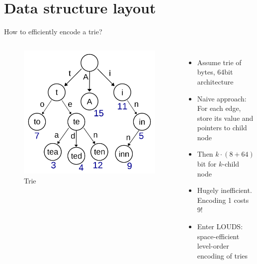 \documentclass{beamer}
\begin{document}
\section{Data structure layout}

\begin{frame}{How to efficiently encode a trie?}
		\begin{columns}
				\begin{figure}
						\centering
						\includegraphics[width=\textwidth]{resources/trie.png}
						\caption{Trie \autocite{booyabazookaTrieExampleSvg}}
				\end{figure}
				\begin{itemize}
						\item Assume trie of bytes, 64bit architecture
						\item Naive approach: For each edge, store its value and
								pointers to child node
						\item Then $k \cdot (8 + 64)$ bit for $k$-child node
						\item Hugely inefficient. Encoding \qty{1}{\byte} costs
								\qty{9}{\byte}!
						\item Enter LOUDS: space-efficient level-order encoding
								of tries \autocite{jacobsonSpaceefficientStaticTrees1989}
				\end{itemize}
		\end{columns}
\end{frame}
\end{document}
